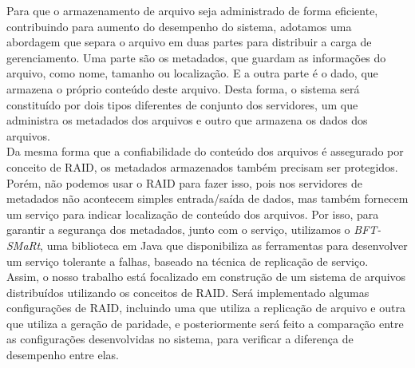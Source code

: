 Para que o armazenamento de arquivo seja administrado de forma eficiente, contribuindo para aumento do desempenho do sistema, adotamos uma abordagem que separa o arquivo em duas partes para distribuir a carga de gerenciamento. 
Uma parte são os metadados, que guardam as informações do arquivo, como nome, tamanho ou localização. E a outra parte é o dado, que armazena o próprio conteúdo deste arquivo. 
Desta forma, o sistema será constituído por dois tipos diferentes de conjunto dos servidores, um que administra os metadados dos arquivos e outro que armazena os dados dos arquivos. 
\\

Da mesma forma que a confiabilidade do conteúdo dos arquivos é assegurado por conceito de RAID, os metadados armazenados também precisam ser protegidos.
Porém, não podemos usar o RAID para fazer isso, pois nos servidores de metadados não acontecem simples entrada/saída de dados, mas também fornecem um serviço para indicar localização de conteúdo dos arquivos. 
Por isso, para garantir a segurança dos metadados, junto com o serviço, utilizamos o \textit{BFT-SMaRt}, uma biblioteca em Java que disponibiliza as ferramentas para desenvolver um serviço tolerante a falhas, baseado na técnica de replicação de serviço.
\\




Assim, o nosso trabalho está focalizado em construção de um sistema de arquivos distribuídos utilizando os conceitos de RAID.
Será implementado algumas configurações de RAID, incluindo uma que utiliza a replicação de arquivo e outra que utiliza a geração de paridade, e posteriormente será feito a comparação entre as configurações desenvolvidas no sistema, para verificar a diferença de desempenho entre elas.
\\











